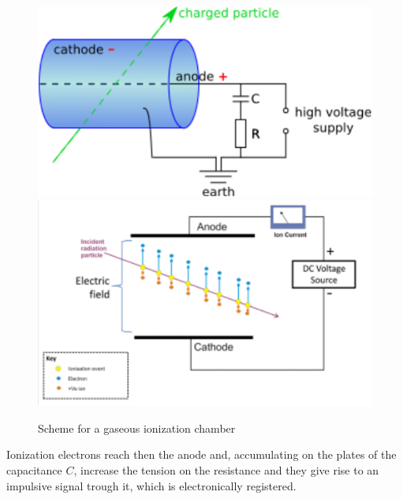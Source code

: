 \documentclass[a4paper,11pt]{book}
\begin{document}
\begin{figure}[hbtp]
\includegraphics{pictures/gas_ion_det.pdf}
\includegraphics{pictures/gas_ion_det_2.pdf}
\caption{Scheme for a gaseous ionization chamber}
\label{fig:gas_ion_ch_scheme}
\end{figure}

Ionization electrons reach then the anode and, accumulating on the plates of the capacitance $C$, increase the tension on the resistance and they give rise to an impulsive signal trough it, which is electronically registered.\\
\end{document}
